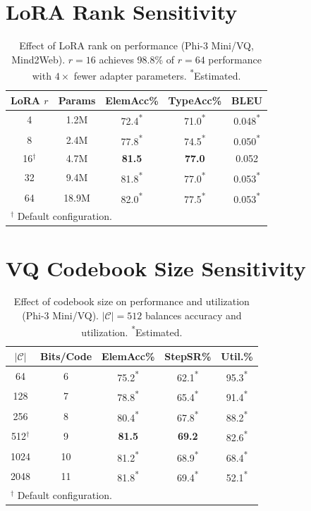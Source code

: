 \documentclass{article}
\newcommand{\best}[1]{\textbf{#1}}
\newcommand{\tbd}[1]{#1\textsuperscript{*}}
\begin{document}
\appendix

\section{LoRA Rank Sensitivity}
\label{app:lora}

\begin{table}[h]
\centering
\caption{Effect of LoRA rank on performance (Phi-3 Mini/VQ, Mind2Web).  $r{=}16$ achieves 98.8\% of $r{=}64$ performance with $4\times$ fewer adapter parameters.  \textsuperscript{*}Estimated.}
\small
\begin{tabular}{ccccc}
\toprule
\textbf{LoRA $r$} & \textbf{Params} & \textbf{ElemAcc\%} & \textbf{TypeAcc\%} & \textbf{BLEU} \\
\midrule
4 & 1.2M & \tbd{72.4} & \tbd{71.0} & \tbd{0.048} \\
8 & 2.4M & \tbd{77.8} & \tbd{74.5} & \tbd{0.050} \\
16$^\dagger$ & 4.7M & \best{81.5} & \best{77.0} & 0.052 \\
32 & 9.4M & \tbd{81.8} & \tbd{77.0} & \tbd{0.053} \\
64 & 18.9M & \tbd{82.0} & \tbd{77.5} & \tbd{0.053} \\
\bottomrule
\multicolumn{5}{l}{\footnotesize $^\dagger$ Default configuration.}
\end{tabular}
\end{table}

\section{VQ Codebook Size Sensitivity}
\label{app:codebook}

\begin{table}[h]
\centering
\caption{Effect of codebook size on performance and utilization (Phi-3 Mini/VQ).  $|\mathcal{C}|{=}512$ balances accuracy and utilization.  \textsuperscript{*}Estimated.}
\small
\begin{tabular}{ccccc}
\toprule
$|\mathcal{C}|$ & \textbf{Bits/Code} & \textbf{ElemAcc\%} & \textbf{StepSR\%} & \textbf{Util.\%} \\
\midrule
64 & 6 & \tbd{75.2} & \tbd{62.1} & \tbd{95.3} \\
128 & 7 & \tbd{78.8} & \tbd{65.4} & \tbd{91.4} \\
256 & 8 & \tbd{80.4} & \tbd{67.8} & \tbd{88.2} \\
512$^\dagger$ & 9 & \best{81.5} & \best{69.2} & \tbd{82.6} \\
1024 & 10 & \tbd{81.2} & \tbd{68.9} & \tbd{68.4} \\
2048 & 11 & \tbd{81.8} & \tbd{69.4} & \tbd{52.1} \\
\bottomrule
\multicolumn{5}{l}{\footnotesize $^\dagger$ Default configuration.}
\end{tabular}
\end{table}
\end{document}
